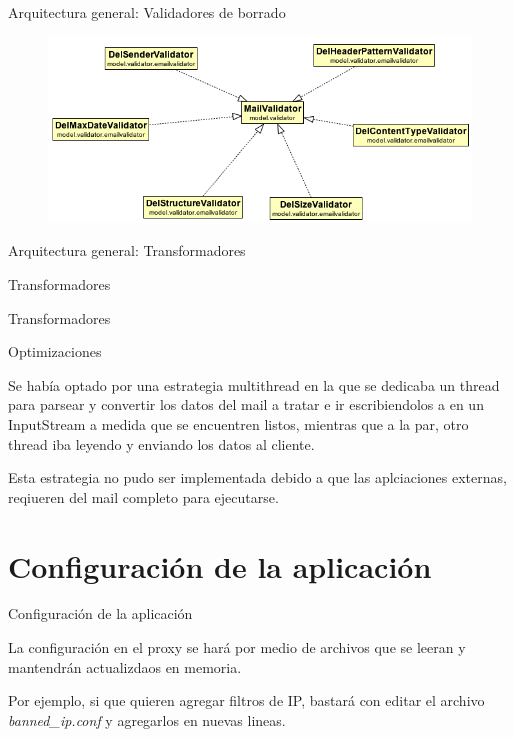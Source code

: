 \documentclass{beamer}
\begin{document}
\begin{frame}{Arquitectura general: Validadores de borrado}
\begin{figure}[H]
\begin{center}
\includegraphics[scale=0.5]{images/NotDelValidators.png}
\end{center}
\end{figure}
\end{frame}

\begin{frame}{Arquitectura general: Transformadores}
\par Transformadores

\end{frame}

\begin{frame}{Transformadores}
\par Optimizaciones
\par  
\par Se había optado por una estrategia multithread en la que se dedicaba un thread para parsear y convertir los datos del mail a tratar e ir escribiendolos a en un InputStream a medida que se encuentren listos, mientras que a la par, otro thread iba leyendo y enviando los datos al cliente.
\par Esta estrategia no pudo ser implementada debido a que las aplciaciones externas, reqiueren del mail completo para ejecutarse.
\end{frame}


\section{Configuración de la aplicación}
\begin{frame}{Configuración de la aplicación}

\par La configuración en el proxy se hará por medio de archivos que se leeran y mantendrán actualizdaos en memoria.\\[1cm]
\par Por ejemplo, si que quieren agregar filtros de IP, bastará con editar el archivo \textit{banned\_ip.conf} y agregarlos en nuevas lineas.

\end{frame}
\end{document}
